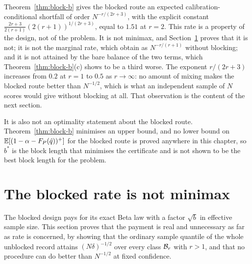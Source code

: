 \documentclass[../../../main.tex]{subfiles}
\begin{document}
\begin{remark}\label{rem:sharp-rate}
Theorem~\ref{thm:block-b} gives the blocked route an expected calibration-conditional shortfall of order $N^{-r/(2r+3)}$, with the explicit constant $\frac{2r+3}{2(r+1)}(2(r+1))^{1/(2r+3)}$, equal to $1.51$ at $r=2$. This rate is a property of the design, not of the problem. It is not minimax, and Section~\ref{sec:sharp-notminimax} proves that it is not; it is not the marginal rate, which \citet[Cor.~2]{barber2026} obtain as $N^{-r/(r+1)}$ without blocking; and it is not attained by the bare balance of the two terms, which Theorem~\ref{thm:block-b}(c) shows to be a third worse. The exponent $r/(2r+3)$ increases from $0.2$ at $r=1$ to $0.5$ as $r\to\infty$: no amount of mixing makes the blocked route better than $N^{-1/2}$, which is what an independent sample of $N$ scores would give without blocking at all. That observation is the content of the next section.

It is also not an optimality statement about the blocked route. Theorem~\ref{thm:block-b} minimises an upper bound, and no lower bound on $\mathbb{E}[(1-\alpha-F_P(\hat q))^+]$ for the blocked route is proved anywhere in this chapter, so $b^*$ is the block length that minimises the certificate and is not shown to be the best block length for the problem.
\end{remark}


\section{The blocked rate is not minimax}\label{sec:sharp-notminimax}

The blocked design pays for its exact Beta law with a factor $\sqrt{b}$ in effective sample size. This section proves that the payment is real and unnecessary as far as rate is concerned, by showing that the ordinary sample quantile of the whole unblocked record attains $(N\delta)^{-1/2}$ over every class $\mathcal B_{r}$ with $r>1$, and that no procedure can do better than $N^{-1/2}$ at fixed confidence.
\end{document}
